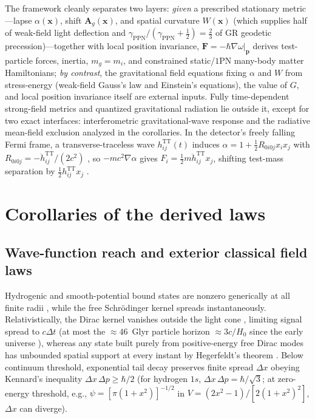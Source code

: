 \documentclass[aps,prd,onecolumn,tightenlines,nofootinbib,notitlepage,10pt,floatfix]{revtex4-2}
\theoremstyle{indentedtheorem}
\begin{document}
The framework cleanly separates two layers: \emph{given} a prescribed stationary metric---lapse $\alpha(\mathbf{x})$, shift $\mathbf{A}_g(\mathbf{x})$, and spatial curvature $W(\mathbf{x})$ (which supplies half of weak-field light deflection and $\gamma_\text{PPN}/(\gamma_\text{PPN}+\tfrac{1}{2})=\tfrac{2}{3}$ of GR geodetic precession)---together with local position invariance, $\mathbf{F}=-\hbar\nabla\omega|_{\mathbf{p}}$ derives test-particle forces, inertia, $m_g=m_i$, and constrained static/$1$PN many-body matter Hamiltonians; \emph{by contrast}, the gravitational field equations fixing $\alpha$ and $W$ from stress-energy (weak-field Gauss's law and Einstein's equations), the value of $G$, and local position invariance itself are external inputs. Fully time-dependent strong-field metrics and quantized gravitational radiation lie outside it, except for two exact interfaces: interferometric gravitational-wave response and the radiative mean-field exclusion analyzed in the corollaries. In the detector's freely falling Fermi frame, a transverse-traceless wave $h_{ij}^\text{TT}(t)$ induces $\alpha=1+\tfrac{1}{2}R_{0i0j}x_i x_j$ with $R_{0i0j}=-\ddot{h}_{ij}^\text{TT}/(2c^2)$ \citep{Rakhmanov2014Fermi}, so $-mc^2\nabla\alpha$ gives $F_i=\tfrac{1}{2}m\ddot{h}_{ij}^\text{TT}x_j$, shifting test-mass separation by $\tfrac{1}{2}h_{ij}^\text{TT}x_j$ \citep{Flanagan2005Basics}.

\section{Corollaries of the derived laws}
\label{sec:discussion}

\subsection{Wave-function reach and exterior classical field laws}
\label{sec:reach}

Hydrogenic and smooth-potential bound states are nonzero generically at all finite radii \citep{Sakurai2020Modern}, while the free Schr\"odinger kernel spreads instantaneously. Relativistically, the Dirac kernel vanishes outside the light cone \citep{Thaller1992Dirac}, limiting signal spread to $c\Delta t$ (at most the $\approx 46$~Glyr particle horizon $\approx 3c/H_0$ since the early universe \citep{DavisLineweaver2004Expanding}), whereas any state built purely from positive-energy free Dirac modes has unbounded spatial support at every instant by Hegerfeldt's theorem \citep{Hegerfeldt1998Instantaneous}. Below continuum threshold, exponential tail decay preserves finite spread $\Delta x$ obeying Kennard's inequality $\Delta x\,\Delta p\ge\hbar/2$ (for hydrogen $1s$, $\Delta x\,\Delta p=\hbar/\sqrt{3}$; at zero-energy threshold, e.g., $\psi=[\pi(1+x^2)]^{-1/2}$ in $V=(2x^2-1)/[2(1+x^2)^2]$, $\Delta x$ can diverge).
\end{document}
